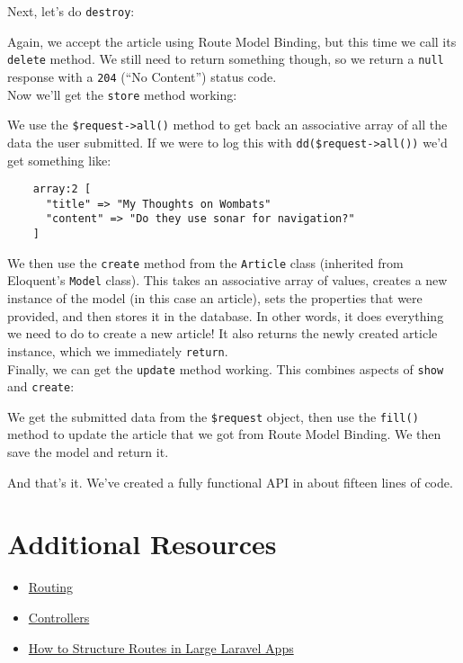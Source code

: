 Next, let's do \texttt{destroy}:


Again, we accept the article using Route Model Binding, but this time we call its \texttt{delete} method. We still need to return something though, so we return a \texttt{null} response with a \texttt{204} (``No Content'') status code.
\\

Now we'll get the \texttt{store} method working:


We use the \texttt{\$request->all()} method to get back an associative array of all the data the user submitted. If we were to log this with \texttt{dd(\$request->all())} we'd get something like:

\begin{verbatim}
    array:2 [
      "title" => "My Thoughts on Wombats"
      "content" => "Do they use sonar for navigation?"
    ]
\end{verbatim}

We then use the \texttt{create} method from the \texttt{Article} class (inherited from Eloquent's \texttt{Model} class). This takes an associative array of values, creates a new instance of the model (in this case an article), sets the properties that were provided, and then stores it in the database. In other words, it does everything we need to do to create a new article! It also returns the newly created article instance, which we immediately \texttt{return}.
\\

Finally, we can get the \texttt{update} method working. This combines aspects of \texttt{show} and \texttt{create}:


We get the submitted data from the \texttt{\$request} object, then use the \texttt{fill()} method to update the article that we got from Route Model Binding. We then save the model and return it.

\hr

And that's it. We've created a fully functional API in about fifteen lines of code.


\section{Additional Resources}

\begin{itemize}[leftmargin=*]
    \item \href{https://laravel.com/docs/master/routing}{Routing}
    \item \href{http://laravel.com/docs/master/controllers}{Controllers}
    \item \href{https://laraveldaily.com/how-to-structure-routes-in-large-laravel-projects/}{How to Structure Routes in Large Laravel Apps}
\end{itemize}
